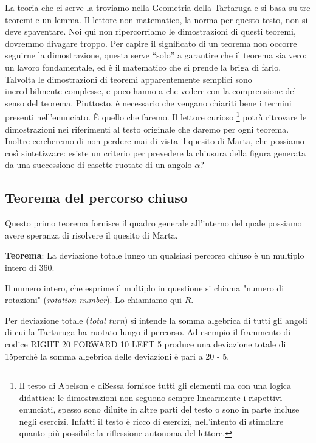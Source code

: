 La teoria che ci serve la troviamo nella Geometria della Tartaruga\cite{Abelson} e si basa su tre teoremi e un lemma. Il lettore non matematico, la norma per questo testo, non si deve spaventare. Noi qui non ripercorriamo le dimostrazioni di questi teoremi, dovremmo divagare troppo. Per capire il significato di un teorema non occorre seguirne la dimostrazione, questa serve ``solo'' a garantire che il teorema sia vero: un lavoro fondamentale, ed è il matematico che si prende la briga di farlo. Talvolta le dimostrazioni di teoremi apparentemente semplici sono incredibilmente complesse, e poco hanno a che vedere con la comprensione del senso del teorema. Piuttosto, è necessario che vengano chiariti bene i termini presenti nell'enunciato. È quello che faremo. Il lettore curioso  \footnote{Il testo di Abelson e diSessa fornisce tutti gli elementi ma con una logica didattica: le dimostrazioni non seguono sempre linearmente i rispettivi enunciati, spesso sono diluite in altre parti del testo o sono in parte incluse negli esercizi. Infatti il testo è ricco di esercizi, nell'intento di stimolare quanto più possibile la riflessione autonoma del lettore.} potrà ritrovare le dimostrazioni nei riferimenti al testo originale\cite{Abelson} che daremo per ogni teorema. Inoltre cercheremo di non perdere mai di vista il quesito di Marta, che possiamo così sintetizzare: esiste un criterio per prevedere la chiusura della figura generata da una successione di casette ruotate di un angolo $\alpha$?

\subsection{Teorema del percorso chiuso}

Questo primo teorema fornisce il quadro generale all'interno del quale possiamo avere speranza di risolvere il quesito di Marta.

\textbf{Teorema}: La deviazione totale lungo un qualsiasi percorso chiuso è un multiplo intero di 360\degree.

Il numero intero, che esprime il multiplo in questione si chiama "numero di rotazioni" (\emph{rotation number}). Lo chiamiamo qui $R$. 

Per deviazione totale (\emph{total turn}) si intende la somma algebrica di tutti gli angoli di cui la Tartaruga ha ruotato lungo il percorso. Ad esempio il frammento di codice RIGHT 20 FORWARD 10 LEFT 5 produce una deviazione totale di 15\degree perché la somma algebrica delle deviazioni è pari a 20 - 5.
 
